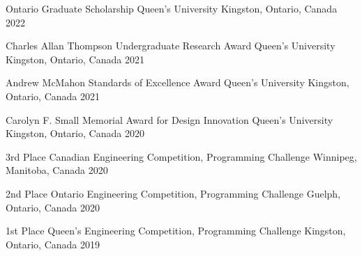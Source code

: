 



\begin{cvhonors}


  \cvhonor
    {Ontario Graduate Scholarship} %
    {Queen's University} %
    {Kingston, Ontario, Canada} %
    {2022} %

  \cvhonor
    {Charles Allan Thompson Undergraduate Research Award} %
    {Queen's University} %
    {Kingston, Ontario, Canada} %
    {2021} %

  \cvhonor
    {Andrew McMahon Standards of Excellence Award} %
    {Queen's University} %
    {Kingston, Ontario, Canada} %
    {2021} %

  \cvhonor
    {Carolyn F. Small Memorial Award for Design Innovation} %
    {Queen's University} %
    {Kingston, Ontario, Canada} %
    {2020} %

  \cvhonor
    {3rd Place} %
    {Canadian Engineering Competition, Programming Challenge} %
    {Winnipeg, Manitoba, Canada} %
    {2020} %

  \cvhonor
    {2nd Place} %
    {Ontario Engineering Competition, Programming Challenge} %
    {Guelph, Ontario, Canada} %
    {2020} %

  \cvhonor
    {1st Place} %
    {Queen's Engineering Competition, Programming Challenge} %
    {Kingston, Ontario, Canada} %
    {2019} %
    
\end{cvhonors}